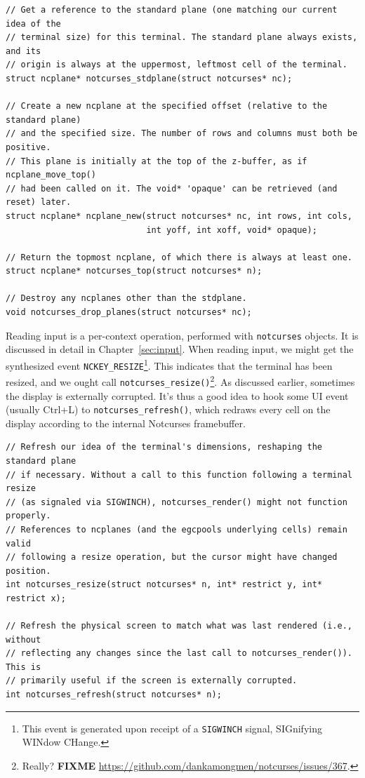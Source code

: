\documentclass[letterpaper,10pt]{article}
\begin{document}
\begin{listing}[!htbp]
\begin{verbatim}
// Get a reference to the standard plane (one matching our current idea of the
// terminal size) for this terminal. The standard plane always exists, and its
// origin is always at the uppermost, leftmost cell of the terminal.
struct ncplane* notcurses_stdplane(struct notcurses* nc);

// Create a new ncplane at the specified offset (relative to the standard plane)
// and the specified size. The number of rows and columns must both be positive.
// This plane is initially at the top of the z-buffer, as if ncplane_move_top()
// had been called on it. The void* 'opaque' can be retrieved (and reset) later.
struct ncplane* ncplane_new(struct notcurses* nc, int rows, int cols,
                            int yoff, int xoff, void* opaque);

// Return the topmost ncplane, of which there is always at least one.
struct ncplane* notcurses_top(struct notcurses* n);

// Destroy any ncplanes other than the stdplane.
void notcurses_drop_planes(struct notcurses* nc);
\end{verbatim}
\end{listing}

Reading input is a per-context operation, performed with \texttt{notcurses}
objects. It is discussed in detail in Chapter~\ref{sec:input}. When reading
input, we might get the synthesized event \texttt{NCKEY\_RESIZE}\footnote{This
event is generated upon receipt of a \texttt{SIGWINCH} signal, SIGnifying WINdow
CHange.}. This indicates that the terminal has been resized, and we ought call
\texttt{notcurses\_resize()}\footnote{Really? \textbf{FIXME} \url{https://github.com/dankamongmen/notcurses/issues/367}.}.
As discussed earlier, sometimes the display is externally corrupted. It's thus
a good idea to hook some UI event (usually Ctrl+L) to \texttt{notcurses\_refresh()},
which redraws every cell on the display according to the internal Notcurses
framebuffer.

\begin{listing}[!htbp]
\begin{verbatim}
// Refresh our idea of the terminal's dimensions, reshaping the standard plane
// if necessary. Without a call to this function following a terminal resize
// (as signaled via SIGWINCH), notcurses_render() might not function properly.
// References to ncplanes (and the egcpools underlying cells) remain valid
// following a resize operation, but the cursor might have changed position.
int notcurses_resize(struct notcurses* n, int* restrict y, int* restrict x);

// Refresh the physical screen to match what was last rendered (i.e., without
// reflecting any changes since the last call to notcurses_render()). This is
// primarily useful if the screen is externally corrupted.
int notcurses_refresh(struct notcurses* n);
\end{verbatim}
\end{listing}
\end{document}
